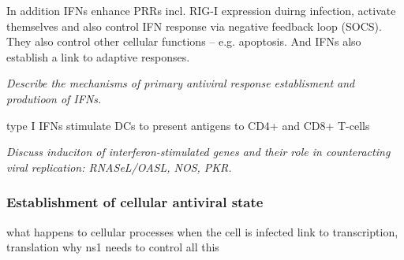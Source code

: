 		
		In addition IFNs enhance PRRs incl. RIG-I expression duirng infection, activate themselves and also control IFN response via negative feedback loop (SOCS). They also control other cellular functions -- e.g. apoptosis. And IFNs also establish a link to adaptive responses.
		
		
		
		
		\textit{Describe the mechanisms of primary antiviral response establisment and produtioon of IFNs.}
		
		type I IFNs stimulate DCs to present antigens to CD4+ and CD8+ T-cells
		
		
		\textit{Discuss induciton of interferon-stimulated genes and their role in counteracting viral replication: RNASeL/OASL, NOS, PKR.}
		
		
		\subsubsection{Establishment of cellular antiviral state}
		
		what happens to cellular processes when the cell is infected
		link to transcription, translation 
		why ns1 needs to control all this
		
